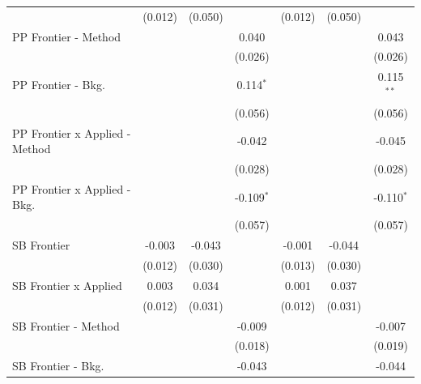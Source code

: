 \begin{tabular}{lcccccc}
                                  & (0.012)        & (0.050)       &               & (0.012)        & (0.050)       &   \\   
   PP Frontier - Method           &                &               & 0.040         &                &               & 0.043\\   
                                  &                &               & (0.026)       &                &               & (0.026)\\   
   PP Frontier - Bkg.             &                &               & 0.114$^{*}$   &                &               & 0.115$^{**}$\\   
                                  &                &               & (0.056)       &                &               & (0.056)\\   
   PP Frontier x Applied - Method &                &               & -0.042        &                &               & -0.045\\   
                                  &                &               & (0.028)       &                &               & (0.028)\\   
   PP Frontier x Applied - Bkg.   &                &               & -0.109$^{*}$  &                &               & -0.110$^{*}$\\   
                                  &                &               & (0.057)       &                &               & (0.057)\\   
   SB Frontier                    & -0.003         & -0.043        &               & -0.001         & -0.044        &   \\   
                                  & (0.012)        & (0.030)       &               & (0.013)        & (0.030)       &   \\   
   SB Frontier x Applied          & 0.003          & 0.034         &               & 0.001          & 0.037         &   \\   
                                  & (0.012)        & (0.031)       &               & (0.012)        & (0.031)       &   \\   
   SB Frontier - Method           &                &               & -0.009        &                &               & -0.007\\   
                                  &                &               & (0.018)       &                &               & (0.019)\\   
   SB Frontier - Bkg.             &                &               & -0.043        &                &               & -0.044\\   

\end{tabular}
